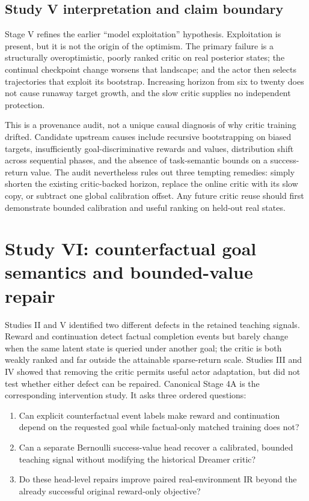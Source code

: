 \documentclass[10pt]{article}
\begin{document}
\subsection{Study V interpretation and claim boundary}

Stage V refines the earlier ``model exploitation'' hypothesis. Exploitation is present, but it is not the origin of the optimism. The primary failure is a structurally overoptimistic, poorly ranked critic on real posterior states; the continual checkpoint change worsens that landscape; and the actor then selects trajectories that exploit its bootstrap. Increasing horizon from six to twenty does not cause runaway target growth, and the slow critic supplies no independent protection.

This is a provenance audit, not a unique causal diagnosis of why critic training drifted. Candidate upstream causes include recursive bootstrapping on biased targets, insufficiently goal-discriminative rewards and values, distribution shift across sequential phases, and the absence of task-semantic bounds on a success-return value. The audit nevertheless rules out three tempting remedies: simply shorten the existing critic-backed horizon, replace the online critic with its slow copy, or subtract one global calibration offset. Any future critic reuse should first demonstrate bounded calibration and useful ranking on held-out real states.

\section{Study VI: counterfactual goal semantics and bounded-value repair}

Studies II and V identified two different defects in the retained teaching
signals. Reward and continuation detect factual completion events but barely
change when the same latent state is queried under another goal; the critic is
both weakly ranked and far outside the attainable sparse-return scale. Studies
III and IV showed that removing the critic permits useful actor adaptation,
but did not test whether either defect can be repaired. Canonical Stage 4A is
the corresponding intervention study. It asks three ordered questions:
\begin{enumerate}
  \item Can explicit counterfactual event labels make reward and continuation
  depend on the requested goal while factual-only matched training does not?
  \item Can a separate Bernoulli success-value head recover a calibrated,
  bounded teaching signal without modifying the historical Dreamer critic?
  \item Do these head-level repairs improve paired real-environment IR beyond
  the already successful original reward-only objective?
\end{enumerate}
\end{document}
